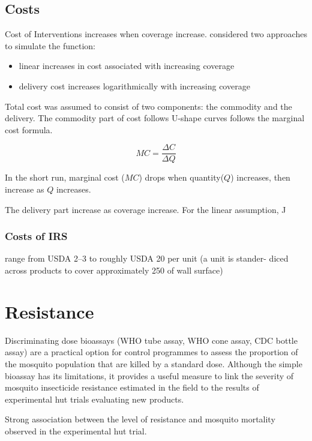 \documentclass[a4paper, 12pt, twoside]{article}
\begin{document}
\subsection{Costs}
Cost of Interventions increases when coverage increase.\cite{Winskill2017a} considered two approaches to simulate the function:
\begin{itemize}
	\item linear increases in cost associated with increasing coverage
	\item delivery cost increases logarithmically with increasing coverage
\end{itemize}

Total cost was assumed to consist of two components: the commodity and the delivery. The commodity part of cost follows U-shape curves follows the marginal cost formula.

$$ MC = \frac{\Delta C}{\Delta Q} $$

In the short run, marginal cost ($MC$) drops when quantity($Q$) increases, then increase as $Q$ increases.

The delivery part increase as coverage increase. For the linear assumption, J

\subsubsection{Costs of IRS}
range from USDA 2–3 to roughly USDA 20 per unit\cite{Oxborough2016}
(a unit is stander- diced across products to cover approximately 250 of wall surface)

\section{Resistance}

Discriminating dose bioassays (WHO tube assay, WHO cone assay, CDC bottle assay) are a practical option for control programmes to assess the proportion of the mosquito population that are killed by a standard dose.
Although the simple bioassay has its limitations, it provides a useful measure to link the severity of mosquito insecticide resistance estimated in the field to the results of experimental hut trials evaluating new products.

Strong association between the level of resistance and mosquito mortality observed in the experimental hut trial\cite{Sherrard-Smith2018b}.

\end{document}
